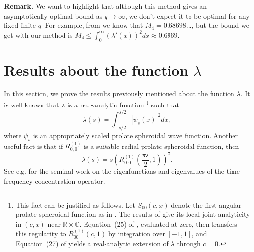 \documentclass[11pt, a4paper, reqno]{amsart}
\theoremstyle{remark}
\begin{document}
\textbf{Remark.}
We want to highlight that although this method gives an asymptotically optimal bound as $q\to\infty$, we don't expect it to be optimal for any fixed finite $q$. For example, from \cite{Garsia} we know that $M_4 = 0.68698...$, but the bound we get with our method is $M_4\leq \int_0^{\infty} (\lambda'(x))^{2}dx \approx 0.6969$.

\section{Results about the function \texorpdfstring{$\lambda$}{lambda}}
In this section, we prove the results previously mentioned about the function $\lambda$.
It is well known that $\lambda$ is a real-analytic function \footnote{This fact can be justified as follows. Let \(S_{00}(c,x)\) denote the first angular prolate spheroidal function as in \cite{SlepianPollakI}. The results of \cite[\S\S 3.21--3.23, pp.~230--238]{MeixnerSchaefke1954} give its local joint analyticity in \((c,x)\) near \(\mathbb{R}\times\mathbb{C}\). Equation~(25) of \cite{SlepianPollakI}, evaluated at zero, then transfers this regularity to \(R_{00}^{(1)}(c,1)\) by integration over \([-1,1]\), and Equation~(27) of \cite{SlepianPollakI} yields a real-analytic extension of \(\lambda\) through \(c=0\).} such that
$$\lambda(s) = \int_{-s/2}^{s/2}|\psi_s(x)|^2 dx,$$
where $\psi_s$ is an appropriately scaled prolate spheroidal wave function.
Another useful fact is that if $R_{0,0}^{(1)}$ is a suitable radial prolate spheroidal function, then 
$$\lambda(s) = s \left(R_{0,0}^{(1)}\left(\frac{\pi s}{2},1\right)\right)^2.$$
See e.g. \cite{LandauPollakII,LandauPollakIII,SlepianPollakI} for the seminal work on the eigenfunctions and eigenvalues of the time-frequency concentration operator. 
\end{document}
